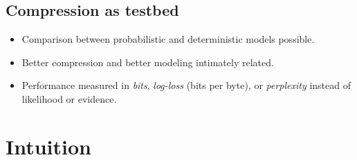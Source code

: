 \documentclass[16pt]{beamer}
\begin{document}
\subsection{Compression as testbed}
\begin{frame}[t]{}
\begin{itemize}
\item Comparison between probabilistic and deterministic models possible.
\item Better compression and better modeling intimately related.
\item Performance measured in {\em bits}, {\em log-loss} (bits per byte), or {\em perplexity} instead of likelihood or evidence.
\end{itemize}

\end{frame}	

\section{Intuition}
\end{document}
